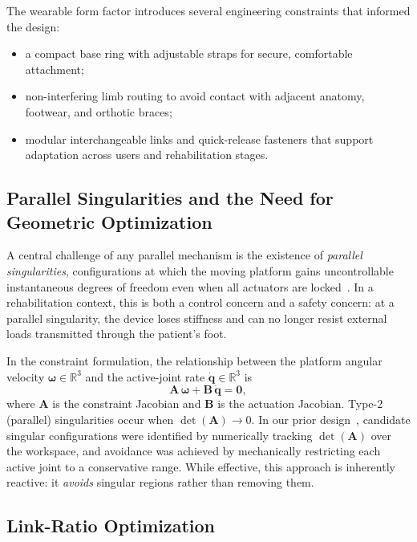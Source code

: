 \documentclass[conference]{IEEEtran}
\begin{document}
The wearable form factor introduces several engineering constraints that informed the design:
\begin{itemize}
\item a compact base ring with adjustable straps for secure, comfortable attachment;
\item non-interfering limb routing to avoid contact with adjacent anatomy, footwear, and orthotic braces;
\item modular interchangeable links and quick-release fasteners that support adaptation across users and rehabilitation stages.
\end{itemize}

\subsection{Parallel Singularities and the Need for Geometric Optimization}

A central challenge of any parallel mechanism is the existence of \emph{parallel singularities}, configurations at which the moving platform gains uncontrollable instantaneous degrees of freedom even when all actuators are locked~\cite{merlet2006jacobian}. In a rehabilitation context, this is both a control concern and a safety concern: at a parallel singularity, the device loses stiffness and can no longer resist external loads transmitted through the patient's foot.

In the constraint formulation, the relationship between the platform angular velocity $\boldsymbol{\omega}\in\mathbb{R}^3$ and the active-joint rate $\dot{\boldsymbol{q}}\in\mathbb{R}^3$ is
\begin{equation}
\mathbf{A}\,\boldsymbol{\omega}+\mathbf{B}\,\dot{\boldsymbol{q}}=\mathbf{0},
\label{eq:constraint}
\end{equation}
where $\mathbf{A}$ is the constraint Jacobian and $\mathbf{B}$ is the actuation Jacobian. Type-2 (parallel) singularities occur when $\det(\mathbf{A})\to 0$. In our prior design~\cite{zhang2025rehab}, candidate singular configurations were identified by numerically tracking $\det(\mathbf{A})$ over the workspace, and avoidance was achieved by mechanically restricting each active joint to a conservative range. While effective, this approach is inherently reactive: it \emph{avoids} singular regions rather than removing them.

\subsection{Link-Ratio Optimization}
\label{sec:optimization}
\end{document}
